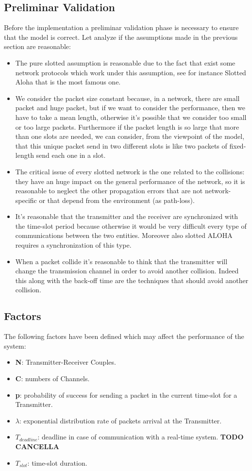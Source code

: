 \subsection{Preliminar Validation}
Before the implementation a preliminar validation phase is necessary to ensure that the model is correct. Let analyze if the assumptions made in the previous section are reasonable:
\begin{itemize}
	\item The pure slotted assumption is reasonable due to the fact that exist some network protocols which work under this assumption, see for instance Slotted Aloha that is the most famous one.
	\item We consider the packet size constant because, in a network, there are small packet and huge packet, but if we want to consider the performance, then we have to take a mean length, otherwise it's possible that we consider too small or too large packets. Furthermore if the packet length is so large that more than one slots are needed, we can consider, from the viewpoint of the model, that this unique packet send in two different slots is like two packets of fixed-length send each one in a slot.
	\item The critical issue of every slotted network is the one related to the collisions: they have an huge impact on the general performance of the network, so it is reasonable to neglect the other propagation errors that are not network-specific or that depend from the environment (as path-loss).
	\item It's reasonable that the transmitter and the receiver are synchronized with the time-slot period because otherwise it would be very difficult every type of communications between the two entities. Moreover also slotted ALOHA requires a synchronization of this type.
	\item When a packet collide it's reasonable to think that the transmitter will change the transmission channel in order to avoid another collision. Indeed this along with the back-off time are the techniques that should avoid another collision. 
\end{itemize}
\subsection{Factors}
The following factors have been defined which may affect the performance of the system:
\begin{itemize}
	\item \textbf{N}: Transmitter-Receiver Couples.
	\item \textbf{C}: numbers of Channels.
	\item \textbf{p}: probability of success for sending a packet in the current time-slot for a Transmitter.
	\item \textbf{$\lambda$}: exponential distribution rate of packets arrival at the Transmitter.
	\item $T_{deadline}$: deadline in case of communication with a real-time system. \textbf{TODO CANCELLA}
	\item $T_{slot}$: time-slot duration.
	
\end{itemize}